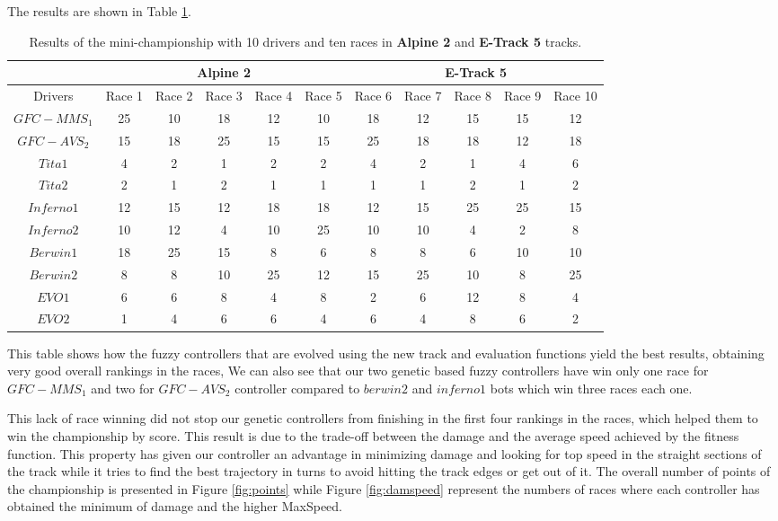 \documentclass[conference]{IEEEtran}
\begin{document}
The results are shown in Table \ref{tab:chsresults}. 
%
\begin{table}[ht]
  \centering
  {\scriptsize
    \caption{ Results of the mini-championship with 10 drivers and ten races in \textbf{Alpine 2} and \textbf{E-Track 5} tracks. }
    {
			\begin{tabular}{|c||c|c|c|c|c|c|c|c|c|c||}
				\hline
			&\multicolumn{5}{|c|}{\textbf{Alpine 2}} &	\multicolumn{5}{|c|}{\textbf{E-Track 5}}\\
				\hline
				\hline	
				Drivers&{Race 1}&{Race 2}&{Race 3}&{Race 4}&{Race 5}&{Race 6}&{Race 7}&{Race 8}&{Race 9}&{Race 10}\\
				\hline	\hline			
				$GFC-MMS_1$&	25&	10&	18&	12&	10&	18&	12&	15&	15&	12\\
				$GFC-AVS_2$&	15&	18&	25&	15&	15&	25&	18&	18&	12&18\\
				$Tita1$&	4&	2&	1&	2&	2&	4&	2&	1&	4&	6\\
				$Tita2$&	2&	1&	2&	1&	1&	1&	1&	2&	1&	2\\
				$Inferno1$&12&15&	12&	18&	18&	12&	15&	25&	25&	15\\
				$Inferno2$&10&12&	4&	10&	25&	10&	10&	4&	2&	8\\
				$Berwin1$&	18&	25&	15&	8&	6&	8&	8&	6&	10&	10\\
				$Berwin2$	&8&	8&	10&	25&	12&	15&	25&	10&	8&	25\\
				$EVO1$&	6&	6&	8&	4&	8&	2&	6&	12&	8&	4\\
				$EVO2$&	1&	4&	6&	6&	4&	6&	4&	8&	6&	2\\
				\hline
				\hline
				
			\end{tabular}
		}\label{tab:chsresults}
	}
\end{table}
%
This table shows how the fuzzy controllers that are evolved using the
new track and evaluation functions yield  the best results, obtaining
very good overall rankings in the races, We can also see that our two
genetic based fuzzy controllers have win  only one race for
$GFC-MMS_1$ and two for $GFC-AVS_2$ controller compared to $berwin2 $
and $inferno1$ bots which win three races each one. 

This lack of race winning did not stop our genetic controllers from
finishing in the first four rankings in the races, which helped them
to win the  championship by score.
This result is due to the trade-off between the damage and the average speed achieved by the fitness function. This property has given our controller an advantage in minimizing damage and looking for top speed in the straight sections of the track while it tries to find the best trajectory in turns to avoid hitting the track edges or get out of it.
The overall number of points of the championship is presented in Figure \ref{fig:points} while Figure \ref{fig:damspeed} represent the numbers of races where each controller has obtained the minimum of damage and the higher MaxSpeed.
\end{document}

